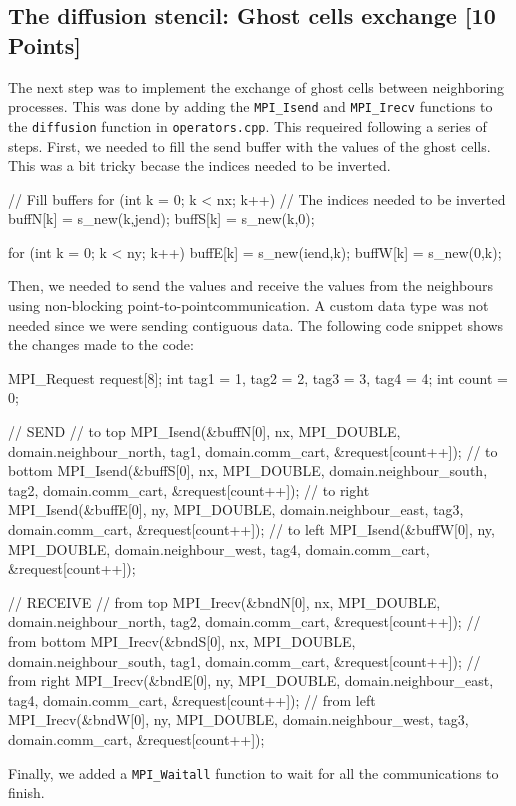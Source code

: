 \documentclass[unicode,11pt,a4paper,oneside,numbers=endperiod,openany]{scrartcl}
\begin{document}
\subsection{The diffusion stencil: Ghost cells exchange [10 Points]}
The next step was to implement the exchange of ghost cells between neighboring
processes. This was done by adding the \texttt{MPI\_Isend} and \texttt{MPI\_Irecv} functions to the
\texttt{diffusion} function in \texttt{operators.cpp}. 
This requeired following a series of steps.
First, we needed to fill the send buffer with the values of the ghost cells.
This was a bit tricky becase the indices needed to be inverted. 
\begin{cppverbatim}
// Fill buffers
for (int k = 0; k < nx; k++)
{
    // The indices needed to be inverted
    buffN[k] = s_new(k,jend);
    buffS[k] = s_new(k,0);
}

for (int k = 0; k < ny; k++)
{
    buffE[k] = s_new(iend,k);
    buffW[k] = s_new(0,k);
}
\end{cppverbatim}
Then, we needed to send the values and receive the values from the neighbours
using non-blocking point-to-pointcommunication. A custom data type was not
needed since we were sending contiguous data. The following code snippet shows
the changes made to the code:
\begin{cppverbatim}
MPI_Request request[8];
int tag1 = 1, tag2 = 2, tag3 = 3, tag4 = 4;
int count = 0;
    
// SEND
//  to top
MPI_Isend(&buffN[0], nx, MPI_DOUBLE, domain.neighbour_north, tag1, domain.comm_cart, &request[count++]);
//  to bottom
MPI_Isend(&buffS[0], nx, MPI_DOUBLE, domain.neighbour_south, tag2, domain.comm_cart, &request[count++]);
//  to right
MPI_Isend(&buffE[0], ny, MPI_DOUBLE, domain.neighbour_east, tag3, domain.comm_cart, &request[count++]);
//  to left
MPI_Isend(&buffW[0], ny, MPI_DOUBLE, domain.neighbour_west, tag4, domain.comm_cart, &request[count++]);

// RECEIVE
// from top
MPI_Irecv(&bndN[0], nx, MPI_DOUBLE, domain.neighbour_north, tag2, domain.comm_cart, &request[count++]);
// from bottom
MPI_Irecv(&bndS[0], nx, MPI_DOUBLE, domain.neighbour_south, tag1, domain.comm_cart, &request[count++]);
// from right
MPI_Irecv(&bndE[0], ny, MPI_DOUBLE, domain.neighbour_east, tag4, domain.comm_cart, &request[count++]);
// from left
MPI_Irecv(&bndW[0], ny, MPI_DOUBLE, domain.neighbour_west, tag3, domain.comm_cart, &request[count++]);
\end{cppverbatim}
Finally, we added a \texttt{MPI\_Waitall} function to wait for all the communications to finish.
\end{document}
